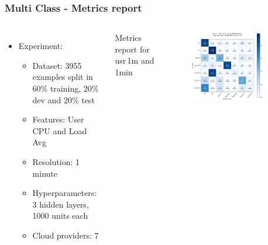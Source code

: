 \documentclass[aspectratio=169,11pt,hyperref={colorlinks=true}]{beamer}
\begin{document}
\begin{frame}
    \frametitle{Multi Class - Metrics report}
    \begin{columns}
        \begin{itemize}
            \item{Experiment:}
            \begin{itemize}
              \item{Dataset: 3955 examples split in 60\% training, 20\% dev and 20\% test}
              \item{Features: User CPU and Load Avg}
              \item{Resolution: 1 minute}
              \item{Hyperparameters: 3 hidden layers, 1000 units each}
              \item{Cloud providers: 7}
            \end{itemize}
        \end{itemize}
        \begin{center}
         \begin{table}[h!]
           \caption{Metrics report for usr\,1m and 1min}
         \end{table}
        \end{center}
       \begin{center}
        \begin{figure}
          \includegraphics[width=0.85\textwidth]{graphs/confusion_plots/usr_1n_1min_3x1000_title_new.png}
        \end{figure}
        \end{center}
        \vfill
  \end{columns}
\end{frame}
\end{document}
